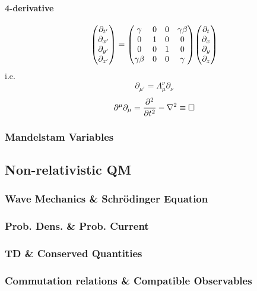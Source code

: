 \documentclass[a4paper]{article}
\numberwithin{equation}{section}
\begin{document}
\paragraph{4-derivative}
\begin{equation}\label{key}
\mqty(\partial_{t'}\\\partial_{x'}\\\partial_{y'}\\\partial_{z'})
= \mqty(\gamma & 0 & 0 & \gamma\beta\\
0 & 1 & 0 & 0\\
0 & 0 & 1 & 0\\
\gamma\beta & 0 & 0 & \gamma)
\mqty(\partial_{t}\\\partial_{x}\\\partial_{y}\\\partial_{z})
\end{equation}
i.e.
\begin{equation}\label{key}
\partial_{\mu'} = \Lambda_\mu^\nu \partial_\nu
\end{equation}
\begin{equation}\label{key}
\partial^\mu\partial_\mu = \pdv[2]{t} - \nabla^2 \equiv \Box
\end{equation}

\subsubsection{Mandelstam Variables}

\subsection{Non-relativistic QM}
\subsubsection{Wave Mechanics \& Schr\"odinger Equation}
\subsubsection{Prob. Dens. \& Prob. Current}

\subsubsection{TD \& Conserved Quantities}

\subsubsection{Commutation relations \& Compatible Observables}
\end{document}
